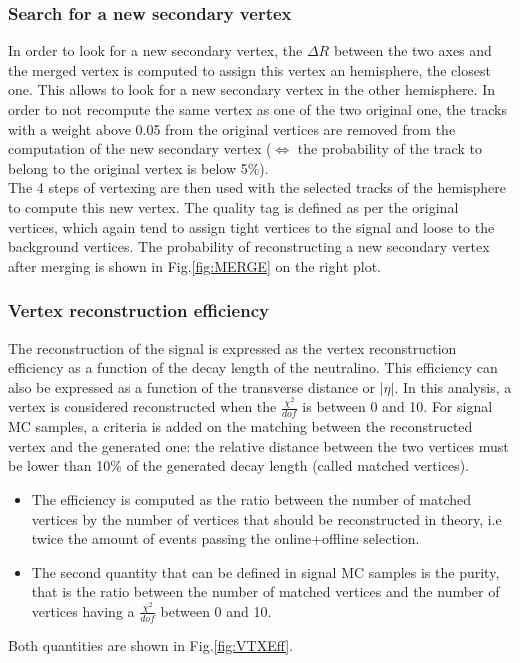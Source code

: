 \documentclass{cernatlasnote}
\begin{document}
\subsubsection{Search for a new secondary vertex}
In order to look for a new secondary vertex, the $\Delta R$ between the two axes and the merged vertex is computed to assign this vertex an hemisphere, the closest one. This allows to look for a new secondary vertex in the other hemisphere. In order to not recompute the same vertex as one of the two original one, the tracks with a weight above 0.05 from the original vertices are removed from the computation of the new secondary vertex ($\Leftrightarrow$ the probability of the track to belong to the original vertex is below 5\%). \\
The 4 steps of vertexing are then used with the selected tracks of the hemisphere to compute this new vertex. The quality tag is defined as per the original vertices, which again tend to assign tight vertices to the signal and loose to the background vertices. The probability of reconstructing a new secondary vertex after merging is shown in Fig.\ref{fig:MERGE} on the right plot.
      
\subsubsection{Vertex reconstruction efficiency}
The reconstruction of the signal is expressed as the vertex reconstruction efficiency as a function of the decay length of the neutralino. This efficiency can also be expressed as a function of the transverse distance  or $|\eta|$.
In this analysis, a vertex is considered reconstructed when the $\frac{\chi^2}{dof}$ is between 0 and 10.  For signal MC samples, a criteria is added on the matching between the reconstructed vertex and the generated one: the relative distance between the two vertices must be lower than 10\% of the generated decay length (called matched vertices). 
\begin{itemize}
\item The efficiency is computed as the ratio between the number of matched vertices by the number of vertices that should be reconstructed in theory, i.e twice the amount of events passing the online+offline selection.
\item The second quantity that can be defined in signal MC samples is the purity, that is the ratio between the number of matched vertices and the number of vertices having a $\frac{\chi^2}{dof}$ between 0 and 10.
\end{itemize}
    Both quantities are shown in Fig.\ref{fig:VTXEff}.  
\end{document}

